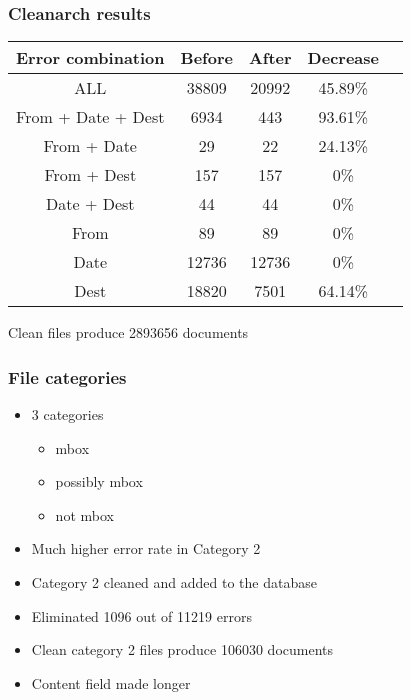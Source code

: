 \documentclass{beamer}
\begin{document}
\begin{frame}

\frametitle{Cleanarch results}

\begin{table}

 \begin{tabular}{|c | c | c | c | c|}
 \hline
 Error combination & Before & After & Decrease \\ [0.5ex]
 \hline\hline
ALL & 38809 & 20992 & 45.89\%\\
\hline
From + Date + Dest & 6934 & 443 & 93.61\%\\
\hline
From + Date & 29 & 22 & 24.13\%\\
\hline
From + Dest & 157 & 157 & 0\%\\
\hline
Date + Dest & 44 & 44 & 0\%\\
\hline
From & 89 & 89 & 0\%\\
\hline
Date &  12736 & 12736 & 0\%\\
\hline
Dest &  18820 & 7501 & 64.14\%\\
\hline

\end{tabular}

\end{table}

Clean files produce 2893656 documents

\end{frame}


\begin{frame}

\frametitle{File categories}

\begin{itemize}

\item 3 categories

\begin{itemize}

\item mbox

\item possibly mbox

\item not mbox

\end{itemize}

\item Much higher error rate in Category 2

\item Category 2 cleaned and added to the database

\item Eliminated 1096 out of 11219 errors

\item Clean category 2 files produce 106030 documents



\item Content field made longer

\end{itemize}

\end{frame}
\end{document}

